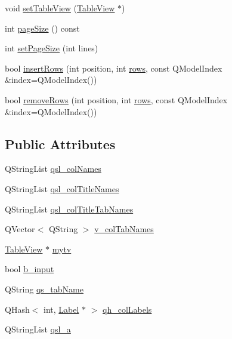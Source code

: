 \begin{DoxyCompactItemize}
\item 
void \hyperlink{classTableModel_a2d38aa0dc5f8d82f159adbe2c6959449}{setTableView} (\hyperlink{classTableView}{TableView} $\ast$)
\item 
int \hyperlink{classTableModel_af33093ef15d3becaa3fa0fd6b5dec732}{pageSize} () const 
\item 
int \hyperlink{classTableModel_aafaa63e6e95adc0178ce814d443dcbce}{setPageSize} (int lines)
\item 
bool \hyperlink{classTableModel_a7fcf06eebf32f5295fec05cadcdf5320}{insertRows} (int position, int \hyperlink{classTableModel_ab55a02518eefc1d6fc1bcf0ea62be849}{rows}, const QModelIndex \&index=QModelIndex())
\item 
bool \hyperlink{classTableModel_abd1d9fd2aebf4ab22a5bc1f1bc4c446d}{removeRows} (int position, int \hyperlink{classTableModel_ab55a02518eefc1d6fc1bcf0ea62be849}{rows}, const QModelIndex \&index=QModelIndex())
\end{DoxyCompactItemize}
\subsection*{Public Attributes}
\begin{DoxyCompactItemize}
\item 
QStringList \hyperlink{classTableModel_af80c02eb0f33a2c10804aae3c35699f8}{qsl\_\-colNames}
\item 
QStringList \hyperlink{classTableModel_a09bb7e46ef71f2a97ea01d73f5e2cb02}{qsl\_\-colTitleNames}
\item 
QStringList \hyperlink{classTableModel_a96ee46443dfe2b3eae27af6919781450}{qsl\_\-colTitleTabNames}
\item 
QVector$<$ QString $>$ \hyperlink{classTableModel_a8cdd6044f20e1442e77bab8f74a3d2fe}{v\_\-colTabNames}
\item 
\hyperlink{classTableView}{TableView} $\ast$ \hyperlink{classTableModel_a8971dba45716f1d616d51f9363935ace}{mytv}
\item 
bool \hyperlink{classTableModel_a575ac8236f73bfeb624eb0971e647e55}{b\_\-input}
\item 
QString \hyperlink{classTableModel_a3cf9e7d2a7d75f156247d572df42d669}{qs\_\-tabName}
\item 
QHash$<$ int, \hyperlink{classLabel}{Label} $\ast$ $>$ \hyperlink{classTableModel_a5a5e432aac68a716c4bf1849d821a846}{qh\_\-colLabels}
\item 
QStringList \hyperlink{classTableModel_ae2d3fd99f245025a7078671bb8b42225}{qsl\_\-a}
\end{DoxyCompactItemize}
